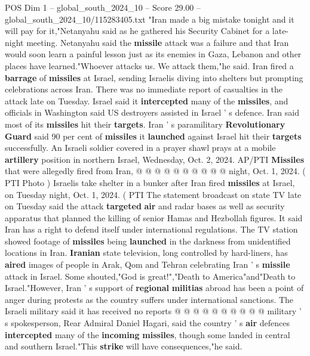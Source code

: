 \begin{textsample}{POS Dim 1 – global\_south\_2024\_10 – Score 29.00 – global\_south\_2024\_10/115283405.txt}  \label{ex:f1_pos_030}
"Iran made a big mistake tonight and it will pay for it,"Netanyahu said as he gathered his Security Cabinet for a late-night meeting.
Netanyahu said the \textbf{missile} attack was a failure and that Iran would soon learn a painful lesson just as its enemies in Gaza, Lebanon and other places have learned."Whoever attacks us.
We attack them,"he said.
Iran fired a \textbf{barrage} of \textbf{missiles} at Israel, sending Israelis diving into shelters but prompting celebrations across Iran.
There was no immediate report of casualties in the attack late on Tuesday.
Israel said it \textbf{intercepted} many of the \textbf{missiles}, and officials in Washington said US destroyers assisted in Israel ' s defence.
Iran said most of its \textbf{missiles} hit their \textbf{targets}.
Iran ' s paramilitary \textbf{Revolutionary} \textbf{Guard} said 90 per cent of \textbf{missiles} it \textbf{launched} against Israel hit their \textbf{targets} successfully.
An Israeli soldier covered in a prayer shawl prays at a mobile \textbf{artillery} position in northern Israel, Wednesday, Oct. 2, 2024.
AP/PTI \textbf{Missiles} that were allegedly fired from Iran, @ @ @ @ @ @ @ @ @ @ night, Oct. 1, 2024. ( PTI Photo ) Israelis take shelter in a bunker after Iran fired \textbf{missiles} at Israel, on Tuesday night, Oct. 1, 2024. ( PTI The statement broadcast on state TV late on Tuesday said the attack \textbf{targeted} \textbf{air} and radar bases as well as security apparatus that planned the killing of senior Hamas and Hezbollah figures.
It said Iran has a right to defend itself under international regulations.
The TV station showed footage of \textbf{missiles} being \textbf{launched} in the darkness from unidentified locations in Iran. \textbf{Iranian} state television, long controlled by hard-liners, has \textbf{aired} images of people in Arak, Qom and Tehran celebrating Iran ' s \textbf{missile} attack in Israel.
Some shouted,"God is great!","Death to America"and"Death to Israel."However, Iran ' s support of \textbf{regional} \textbf{militias} abroad has been a point of anger during protests as the country suffers under international sanctions.
The Israeli military said it has received no reports @ @ @ @ @ @ @ @ @ @ military ' s spokesperson, Rear Admiral Daniel Hagari, said the country ' s \textbf{air} defences \textbf{intercepted} many of the \textbf{incoming} \textbf{missiles}, though some landed in central and southern Israel."This \textbf{strike} will have consequences,"he said.

\end{textsample}
